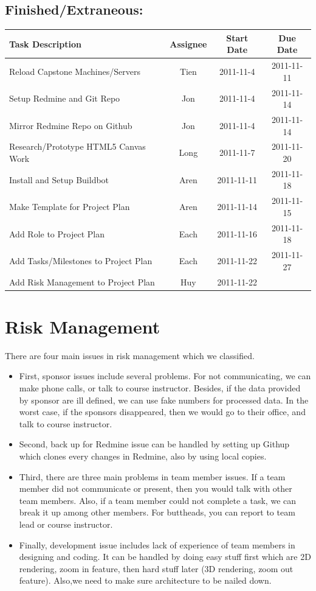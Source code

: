 \documentclass[12pt, letterpaper]{article}
\begin{document}
	\subsection{Finished/Extraneous:}

  \begin{center}
    \begin{tabular}{| l || c | c | c | }
      \hline
      Task Description & Assignee & Start Date & Due Date \\
      \hline
			Reload Capstone Machines/Servers & Tien & 2011-11-4 & 2011-11-11\\
			Setup Redmine and Git Repo & Jon & 2011-11-4 & 2011-11-14 \\
			Mirror Redmine Repo on Github & Jon & 2011-11-4 & 2011-11-14 \\
			Research/Prototype HTML5 Canvas Work & Long & 2011-11-7 & 2011-11-20 \\
      Install and Setup Buildbot & Aren & 2011-11-11 & 2011-11-18 \\
      Make Template for Project Plan & Aren & 2011-11-14 & 2011-11-15 \\
			Add Role to Project Plan & Each & 2011-11-16 & 2011-11-18 \\
			Add Tasks/Milestones to Project Plan & Each & 2011-11-22 & 2011-11-27\\
			Add Risk Management to Project Plan & Huy & 2011-11-22 & \\
      \hline
    \end{tabular}
  \end{center}

\section{Risk Management}
There are four main issues in risk management which we classified. 
\begin{itemize}
     \item First, sponsor issues include several problems. For not
    communicating, we can make phone calls, or talk to course
    instructor. Besides, if the data provided by sponsor are ill defined, we can use fake numbers for processed data. In the worst case, if the sponsors disappeared, then we would go to their office, and talk to course instructor. 
    \item Second, back up for Redmine issue can be handled by setting up Githup which clones every changes in Redmine, also by using local copies.
    \item Third, there are three main problems in team member issues. If a team member did not communicate or present, then you would talk with other team members. Also, if a team member could not complete a task, we can break it up among other members. For buttheads, you can report to team lead or course instructor.
     \item Finally, development issue includes lack of experience of team members in designing and coding. It can be handled by doing easy stuff first which are 2D rendering, zoom in feature, then hard stuff later (3D rendering, zoom out feature). Also,we need to make sure architecture to be nailed down.
\end{itemize}
\end{document}
